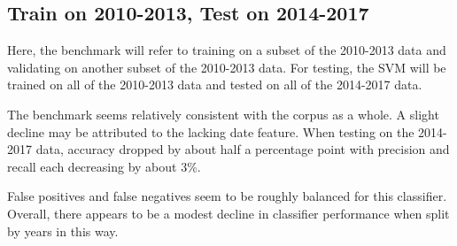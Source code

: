\documentclass [12 pt] {report}
\begin{document}
\subsection{Train on 2010-2013, Test on 2014-2017}
Here, the benchmark will refer to training on a subset of the 2010-2013 data and validating on another subset of the 2010-2013 data. For testing, the SVM will be trained on all of the 2010-2013 data and tested on all of the 2014-2017 data.
\vspace*{-2mm}
\begin{table}[H]
\footnotesize
{}
\label{table:SVM 2010-2013 Train, 2014-2017 Test}
\end{table}
\FloatBarrier
The benchmark seems relatively consistent with the corpus as a whole. A slight decline may be attributed to the lacking date feature. When testing on the 2014-2017 data, accuracy dropped by about half a percentage point with precision and recall each decreasing by about 3\%. 

\vspace*{-2mm}
\begin{table}[H]
\footnotesize
{}
\label{table:Train 2010-2013, Test 2014-2017 Confusion}
\end{table}
\FloatBarrier
False positives and false negatives seem to be roughly balanced for this classifier. Overall, there appears to be a modest decline in classifier performance when split by years in this way.
\end{document}
